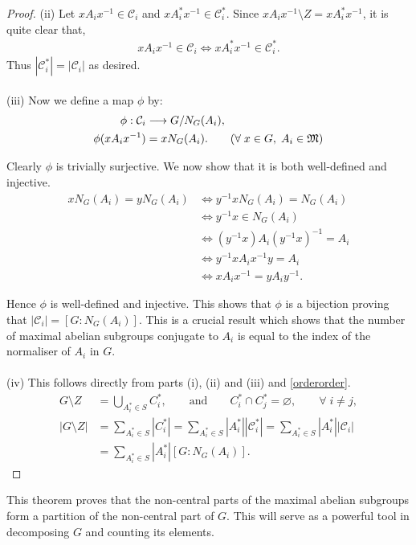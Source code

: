 \begin{proof}
(ii) Let $x A_i x^{-1} \in \mathcal{C}_i$ and $x A_i^* x^{-1} \in \mathcal{C}_i^*$. Since $x A_i x^{-1} \! \setminus \! Z = x A_i^* x^{-1}$, it is quite clear that,
\begin{align*} x A_i x^{-1} \in \mathcal{C}_i \iff x A_i^* x^{-1} \in \mathcal{C}_i^*.
\end{align*}
Thus $|\mathcal{C}_i^*| = |\mathcal{C}_i|$ as desired. \\
\\
(iii) Now we define a map $\phi$ by:
\begin{align*} \phi: \mathcal{C}_i &\longrightarrow G / N_G(A_i),
\\ \phi(xA_ix^{-1}) &= xN_G(A_i). \tag{$\forall \; x \in G, \; A_i \in \mathfrak{M}$}
\end{align*}

Clearly $\phi$ is trivially surjective. We now show that it is both well-defined and injective.
\begin{align*} xN_G(A_i) = yN_G(A_i) &\iff y^{-1}xN_G(A_i) = N_G(A_i) \\
&\iff y^{-1}x \in N_G(A_i) \\
&\iff (y^{-1}x)A_i(y^{-1}x)^{-1} = A_i \\
&\iff y^{-1}xA_ix^{-1}y = A_i \\
&\iff xA_ix^{-1} = yA_iy^{-1}.
\end{align*}

Hence $\phi$ is well-defined and injective. This shows that $\phi$ is a bijection proving that $|\mathcal{C}_i| = [G:N_G(A_i)]$. This is a crucial result which shows that the number of maximal abelian subgroups conjugate to $A_i$ is equal to the index of the normaliser of $A_i$ in $G$. \\
\\
(iv) This follows directly from parts (i), (ii) and (iii) and \eqref{orderorder}.
\begin{align*} G \! \setminus \! Z &= \bigcup\limits_{A_i^* \in S} C_i^*,  \qquad \text{and}  \qquad C_i^* \cap C_j^* = \varnothing, \qquad \forall \;  i \neq j, \\
 |G \! \setminus \! Z| &=  \sum_{A_i^* \in S} |C_i^*| = \sum_{A_i^* \in S} |A_i^*||\mathcal{C}_i^*| = \sum_{A_i^* \in S} |A_i^*||\mathcal{C}_i|
\\ &= \sum_{A_i^* \in S} |A_i^*| [G:N_G(A_i)].
\end{align*}

\end{proof}

This theorem proves that the non-central parts of the maximal abelian subgroups form a partition of the non-central part of $G$. This will serve as a powerful tool in decomposing $G$ and counting its elements.

